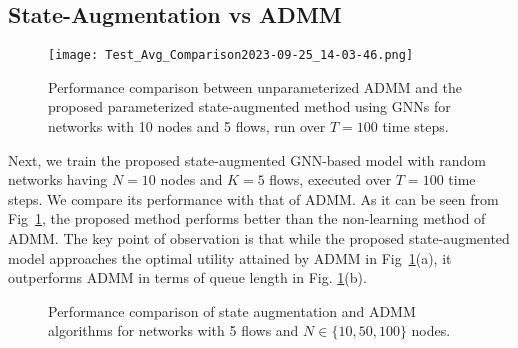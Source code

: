 \documentclass[lettersize,journal]{IEEEtran}
\begin{document}
\subsection{State-Augmentation vs ADMM}
\begin{figure}[h]%
    \centering   
    \texttt{[image: Test\_Avg\_Comparison2023-09-25\_14-03-46.png]}
    \caption{Performance comparison between unparameterized ADMM and the proposed parameterized state-augmented method using GNNs for networks with 10 nodes and 5 flows, run over $T=100$ time steps.}
    \label{Fig:par_vs_unpar}
\end{figure}
Next, we train the proposed state-augmented GNN-based model with random networks having $N=10$ nodes and $K=5$ flows, executed over $T=100$ time steps. We compare its performance with that of ADMM. As it can be seen from %
Fig~\ref{Fig:par_vs_unpar}, the proposed method performs better than the non-learning method of ADMM. The key point of observation is that while the proposed state-augmented model approaches the optimal utility attained by ADMM in Fig~\ref{Fig:par_vs_unpar}(a), it outperforms ADMM in terms of queue length in Fig. \ref{Fig:par_vs_unpar}(b).%
\begin{figure*}[htp]%
    \centering   
    \hfill
    \caption{Performance comparison of state augmentation and ADMM algorithms for networks with 5 flows and $N\in\{10, 50, 100\}$ nodes.}
    \label{Fig:sa_vs_admm_nodes}
\end{figure*}
\end{document}
